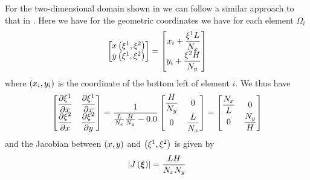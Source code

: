 For the two-dimensional domain shown in
 we can follow a similar approach to that in
. Here we have for the geometric
coordinates we have for each element $\Omega_{i}$
\begin{equation}
  \begin{bmatrix}
     x\left( \xi^{1},\xi^{2} \right)  \\
     y\left( \xi^{1},\xi^{2} \right) 
  \end{bmatrix}= \begin{bmatrix}
    x_{i}+\dfrac{\xi^{1} L}{N_{x}} \\
    y_{i}+\dfrac{\xi^{2} H}{N_{y}}  
  \end{bmatrix}
\end{equation}
where $\left( x_{i},y_{i} \right)$ is the coordinate of the bottom left of element $i$. We thus have 
\begin{equation}
  \begin{bmatrix}
     \dfrac{\partial \xi^{1}}{\partial x}  &  \dfrac{\partial \xi^{1}}{\partial x}  \\
     \dfrac{\partial \xi^{2}}{\partial x}  &  \dfrac{\partial \xi^{2}}{\partial y}          
  \end{bmatrix} = \dfrac{1}{\frac{L}{N_{x}}\frac{H}{N_{y}}-0.0} \begin{bmatrix}
    \dfrac{H}{N_{y}} & 0 \\
    0 & \dfrac{L}{N_{x}}
  \end{bmatrix} = \begin{bmatrix}
    \dfrac{N_{x}}{L} & 0 \\
    0 & \dfrac{N_{y}}{H}
  \end{bmatrix}
\end{equation}
and the Jacobian between $\left( x,y \right)$ and $\left( \xi^{1},\xi^{2} \right)$ is given by
\begin{equation}
  \left|  J\left(  \boldsymbol{\xi}  \right)  \right|=\dfrac{LH}{N_{x}N_{y}}
\end{equation}

